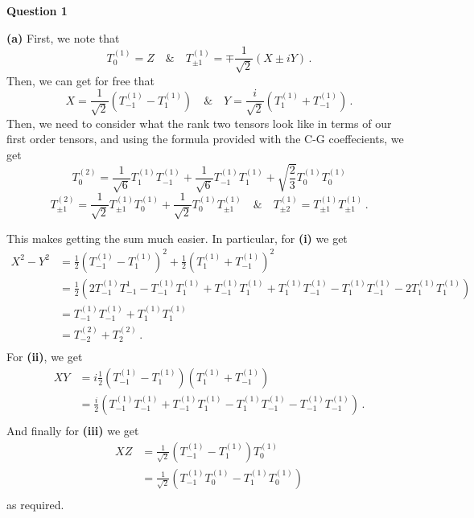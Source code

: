 \documentclass[10pt]{article}
\begin{document}
\textbf{Question 1}

\textbf{(a)} First, we note that
\[ T_{0}^{(1)} = Z \quad \& \quad T_{\pm 1}^{(1)} = \mp \frac{1}{\sqrt{2}}\left(X \pm iY\right)\, . \]
Then, we can get for free that
\[ X = \frac{1}{\sqrt{2}}\left(T_{-1}^{(1)} - T_{1}^{(1)}\right) \quad \& \quad Y = \frac{i}{\sqrt{2}}\left(T_{1}^{(1)} + T_{-1}^{(1)}\right) \, .\]
Then, we need to consider what the rank two tensors look like in terms of our first order tensors, and using the formula provided with the C-G coeffecients, we get
\[ T_{0}^{(2)} = \frac{1}{\sqrt{6}}T_{1}^{(1)}T_{-1}^{(1)} + \frac{1}{\sqrt{6}}T_{-1}^{(1)}T_{1}^{(1)} + \sqrt{\frac{2}{3}}T_{0}^{(1)}T_{0}^{(1)} \]
\[ T_{\pm1}^{(2)} = \frac{1}{\sqrt{2}}T_{\pm 1}^{(1)}T_{0}^{(1)} + \frac{1}{\sqrt{2}}T_{0}^{(1)}T_{\pm1}^{(1)} \quad \& \quad T_{\pm 2}^{(1)} = T_{\pm1}^{(1)}T_{\pm1}^{(1)}\, .\]

This makes getting the sum much easier. In particular, for \textbf{(i)} we get
\begin{equation*}
  \begin{split}
    X^{2} - Y^{2} & = \frac{1}{2}\left(T_{-1}^{(1)} - T_{1}^{(1)}\right)^{2} + \frac{1}{2}\left(T_{1}^{(1)} + T_{-1}^{(1)}\right)^{2} \\
    & = \frac{1}{2}\left(2T_{-1}^{(1)}T_{-1}^{1} - T_{-1}^{(1)}T_{1}^{(1)} + T_{-1}^{(1)}T_{1}^{(1)} + T_{1}^{(1)}T_{-1}^{(1)} - T_{1}^{(1)}T_{-1}^{(1)} - 2T_{1}^{(1)}T_{1}^{(1)}\right) \\
    & = T_{-1}^{(1)}T_{-1}^{(1)} + T_{1}^{(1)}T_{1}^{(1)} \\
    & = \boxed{T_{-2}^{(2)} + T_{2}^{(2)}} \, .\\
  \end{split}
\end{equation*}
For \textbf{(ii)}, we get
\begin{equation*}
  \begin{split}
    XY & = i\frac{1}{2}\left(T_{-1}^{(1)} - T_{1}^{(1)}\right)\left(T_{1}^{(1)} + T_{-1}^{(1)}\right) \\
    & = \boxed{\frac{i}{2}\left(T_{-1}^{(1)}T_{-1}^{(1)} + T_{-1}^{(1)}T_{1}^{(1)} - T_{1}^{(1)}T_{-1}^{(1)} - T_{-1}^{(1)}T_{-1}^{(1)}\right)}\, .\\
  \end{split}
\end{equation*}
And finally for \textbf{(iii)} we get
\begin{equation*}
  \begin{split}
    XZ & = \frac{1}{\sqrt{2}}\left(T_{-1}^{(1)} - T_{1}^{(1)}\right)T_{0}^{(1)} \\
    & = \boxed{\frac{1}{\sqrt{2}}\left(T_{-1}^{(1)}T_{0}^{(1)} - T_{1}^{(1)}T_{0}^{(1)}\right)}\\
  \end{split}
\end{equation*}
as required.
\end{document}
